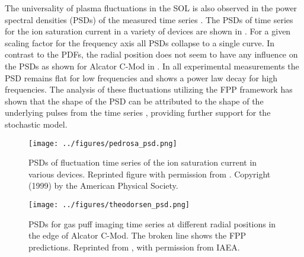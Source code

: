 The universality of plasma fluctuations in the SOL is also observed in the power
spectral densities (PSDs) of the measured time series
\cite{pedrosa1999empirical,carreras1999characterization,theodorsen2017relationship,theodorsen2018universality,kube2018intermittent,garcia2018intermittent}.
The PSDs of time series for the ion saturation current in a variety of devices are shown
in . For a given scaling factor for the frequency axis all PSDs
collapse to a single curve. In contrast to the PDFs, the radial position does not seem
to have any influence on the PSDs as shown for Alcator C-Mod in
. In all experimental measurements the PSD remains flat for
low frequencies and shows a power law decay for high frequencies. The analysis of these
fluctuations utilizing the FPP framework has shown that the shape of the PSD can be
attributed to the shape of the underlying pulses from the time series
\cite{garcia2017auto}, providing further support for the stochastic model.
\begin{figure}
  \centering
  \begin{minipage}{.48\linewidth}
    \texttt{[image: ../figures/pedrosa\_psd.png]}
    \caption{PSDs of fluctuation time series of the ion saturation current in various devices. Reprinted figure with permission from \cite{pedrosa1999empirical}. Copyright (1999) by the American Physical Society.}
    \label{Fig:pedrosa}
  \end{minipage}
  \hfill
  \begin{minipage}{.48\linewidth}
    \texttt{[image: ../figures/theodorsen\_psd.png]}
    \caption{PSDs for gas puff imaging time series at different radial positions in the edge of Alcator C-Mod. The broken line shows the FPP predictions. Reprinted from \cite{theodorsen2017relationship}, with permission from IAEA.}
    \label{Fig:theodorsen_psd}
  \end{minipage}
\end{figure}

